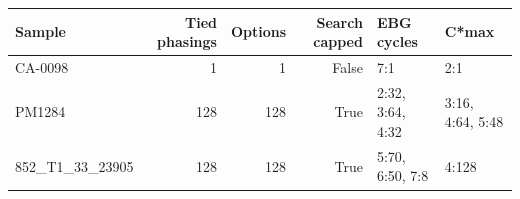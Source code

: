 \begin{tabular}{lrrrll}
\toprule
Sample & Tied phasings & Options & Search capped & EBG cycles & C*max \\
\midrule
CA-0098 & 1 & 1 & False & 7:1 & 2:1 \\
PM1284 & 128 & 128 & True & 2:32, 3:64, 4:32 & 3:16, 4:64, 5:48 \\
852\_T1\_33\_23905 & 128 & 128 & True & 5:70, 6:50, 7:8 & 4:128 \\
\bottomrule
\end{tabular}
